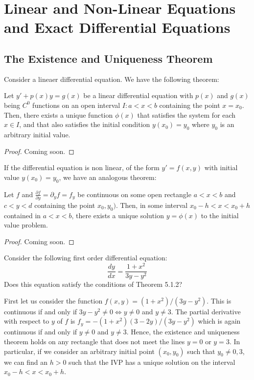 \section{Linear and Non-Linear Equations and Exact Differential Equations}

\subsection{The Existence and Uniqueness Theorem}

Consider a lineaer differential equation. We have the following theorem:

\begin{thmbox}
   Let $y' + p(x)y = g(x)$ be a linear differential equation with $p(x)$ and $g(x)$ being $C^0$ functions on an open interval $I \colon a < x < b$ containing the point $x = x_0$. Then, there exists a unique function $\phi(x)$ that satisfies the system for each $x \in I$, and that also satisfies the initial condition $y(x_0) = y_0$ where $y_0$ is an arbitrary initial value.
\end{thmbox}

\begin{proof}
   Coming soon.
\end{proof}

If the differential equation is non linear, of the form $y' = f(x,y)$ with initial value $y(x_0) = y_0$, we have an analogous theorem:

\begin{thmbox}
   Let $f$ and $\frac{\partial f}{\partial y} = \partial_y f = f_y$ be continuous on some open rectangle $a < x < b$ and $c < y < d$ containing the point $x_0, y_0)$. Then, in some interval $x_0 - h < x < x_0 + h$ contained in $a < x < b$, there exists a unique solution $y = \phi(x)$ to the initial value problem.
\end{thmbox}

\begin{proof}
   Coming soon.
\end{proof}

\begin{example}
   Consider the following first order differential equation:
   \[ \frac{dy}{dx} = \frac{1 + x^2}{3y - y^2} \]
   Does this equation satisfy the conditions of Theorem 5.1.2?
\end{example}
\begin{solution}
   First let us consider the function $f(x,y) = (1 + x^2)/(3y - y^2)$. This is continuous if and only if $3y - y^2 \neq 0 \iff y \neq 0$ and $y \neq 3$. The partial derivative with respect to $y$ of $f$ is $f_y = -(1+x^2)(3-2y)/(3y-y^2)$ which is again continuous if and only if $y \neq 0$ and $y \neq 3$. Hence, the existence and uniqueness theorem holds on any rectangle that does not meet the lines $y = 0$ or $y = 3$. In particular, if we consider an arbitrary initial point $(x_0, y_0)$ such that $y_0 \neq 0, 3$, we can find an $h > 0$ such that the IVP has a unique solution on the interval $x_0 - h < x < x_0 + h$. 
\end{solution}

